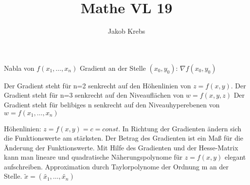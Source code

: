\documentclass{../tudscript}
\author{Jakob Krebs}
\title{Mathe VL 19}
\begin{document}
        Nabla von $f(x_1, \ldots, x_n)$
        Gradient an der Stelle $(x_0, y_0)$: $\nabla f(x_0, y_0)$

        Der Gradient steht für n=2 senkrecht auf den Höhenlinien von $z=f(x,y)$. \label{toproof}
        Der Gradient steht für n=3 senkrecht auf den Niveauflächen von $w = f(x,y,z)$
        Der Gradient steht für belibiges n  senkrecht auf den Niveauhyperebenen von $w = f(x_1, \ldots, x_n)$

        Höhenlinien: $z = f(x,y) = c = const.$
        In Richtung der Gradienten ändern sich die Funktionswerte am stärksten. Der Betrag des Gradienten ist ein Maß für die Änderung der
        Funktionswerte.
        Mit Hilfe des Gradienten und der Hesse-Matrix kann man lineare und quadratische Näherungspolynome für $z=f(x,y)$ elegant aufschreiben.
        Approximation durch Taylorpolynome 
        der Ordnung m an der Stelle. $\tilde{x} = (\tilde{x_1}, \ldots, \tilde{x_n})$
\end{document}

